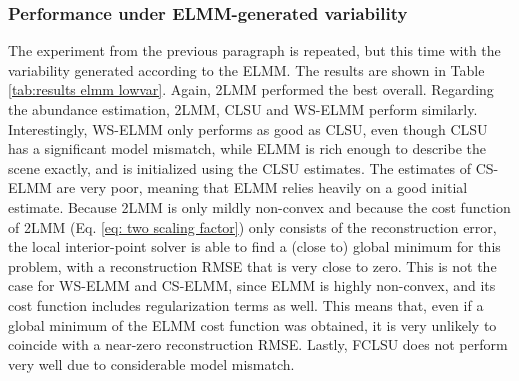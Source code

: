 \subsubsection{Performance under ELMM-generated variability}
The experiment from the previous paragraph is repeated, but this time with the variability generated according to the ELMM. The results are shown in Table \ref{tab:results elmm lowvar}. Again, 2LMM performed the best overall.  
Regarding the abundance estimation, 2LMM, CLSU and WS-ELMM perform similarly. Interestingly, WS-ELMM only performs as good as CLSU, even though CLSU has a significant model mismatch, while ELMM is rich enough to describe the scene exactly, and is initialized using the CLSU estimates. The estimates of CS-ELMM are very poor, meaning that ELMM relies heavily on a good initial estimate. 
Because 2LMM is only mildly non-convex and because the cost function of 2LMM (Eq. \ref{eq: two scaling factor}) only consists of the reconstruction error, the local interior-point solver is able to find a (close to) global minimum for this problem, with a reconstruction RMSE that is very close to zero. This is not the case for WS-ELMM and CS-ELMM, since ELMM is highly non-convex, and its cost function includes regularization terms as well. This means that, even if a global minimum of the ELMM cost function was obtained, it is very unlikely to coincide with a near-zero reconstruction RMSE.
Lastly, FCLSU does not perform very well due to considerable model mismatch. 
